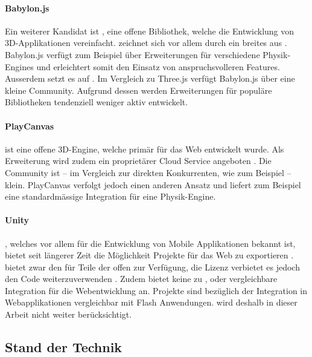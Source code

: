 \paragraph{Babylon.js}
Ein weiterer Kandidat ist , eine offene Bibliothek, welche die Entwicklung von 3D-Applikationen vereinfacht.  zeichnet sich vor allem durch ein breites  aus \cite{babylonjsNpmPackage}. Babylon.js verfügt zum Beispiel über Erweiterungen für verschiedene Physik-Engines und erleichtert somit den Einsatz von anspruchsvolleren Features. Ausserdem setzt es auf .
Im Vergleich zu Three.js verfügt Babylon.js über eine kleine Community. Aufgrund dessen werden Erweiterungen für populäre Bibliotheken tendenziell weniger aktiv entwickelt.

\paragraph{PlayCanvas}
 ist eine offene 3D-Engine, welche primär für das Web entwickelt wurde. Als Erweiterung wird zudem ein proprietärer Cloud Service angeboten \cite{playcanvasNpmPackage}. Die Community ist – im Vergleich zur direkten Konkurrenten, wie zum Beispiel  – klein. PlayCanvas verfolgt jedoch einen anderen Ansatz und liefert zum Beispiel eine standardmässige Integration für eine Physik-Engine.

\paragraph{Unity}
, welches vor allem für die Entwicklung von Mobile Applikationen bekannt ist, bietet seit längerer Zeit die Möglichkeit Projekte für das Web zu exportieren \cite{unityWeb}.
 bietet zwar den  für Teile der  offen zur Verfügung, die Lizenz verbietet es jedoch den Code weiterzuverwenden \cite{unityOpenSource}.
Zudem bietet  keine zu ,  oder  vergleichbare Integration für die Webentwicklung an.  Projekte sind bezüglich der Integration in Webapplikationen vergleichbar mit Flash Anwendungen.  wird deshalb in dieser Arbeit nicht weiter berücksichtigt.

\subsection{Stand der Technik}

